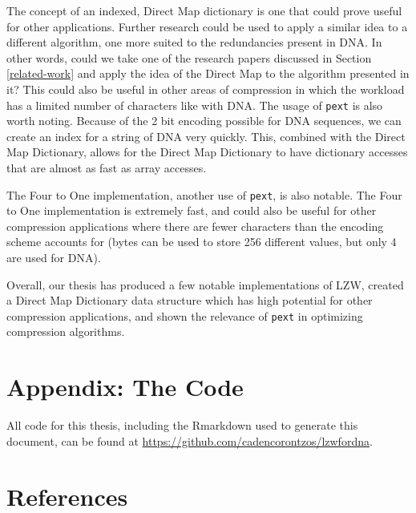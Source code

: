 \documentclass[12pt,twoside]{reedthesis}
\begin{document}
The concept of an indexed, Direct Map dictionary is one that could prove useful for other applications. Further research could be used to apply a similar idea to a different algorithm, one more suited to the redundancies present in DNA. In other words, could we take one of the research papers discussed in Section \ref{related-work} and apply the idea of the Direct Map to the algorithm presented in it? This could also be useful in other areas of compression in which the workload has a limited number of characters like with DNA. The usage of \texttt{pext} is also worth noting. Because of the 2 bit encoding possible for DNA sequences, we can create an index for a string of DNA very quickly. This, combined with the Direct Map Dictionary, allows for the Direct Map Dictionary to have dictionary accesses that are almost as fast as array accesses.

The Four to One implementation, another use of \texttt{pext}, is also notable. The Four to One implementation is extremely fast, and could also be useful for other compression applications where there are fewer characters than the encoding scheme accounts for (bytes can be used to store 256 different values, but only 4 are used for DNA).

Overall, our thesis has produced a few notable implementations of LZW, created a Direct Map Dictionary data structure which has high potential for other compression applications, and shown the relevance of \texttt{pext} in optimizing compression algorithms.

\appendix

\hypertarget{appendix-the-code}{%
\chapter{Appendix: The Code}\label{appendix-the-code}}

All code for this thesis, including the Rmarkdown used to generate this document, can be found at \url{https://github.com/cadencorontzos/lzwfordna}.

\backmatter

\hypertarget{references}{%
\chapter*{References}\label{references}}


\noindent

\setlength{\parindent}{-0.20in}
\end{document}
